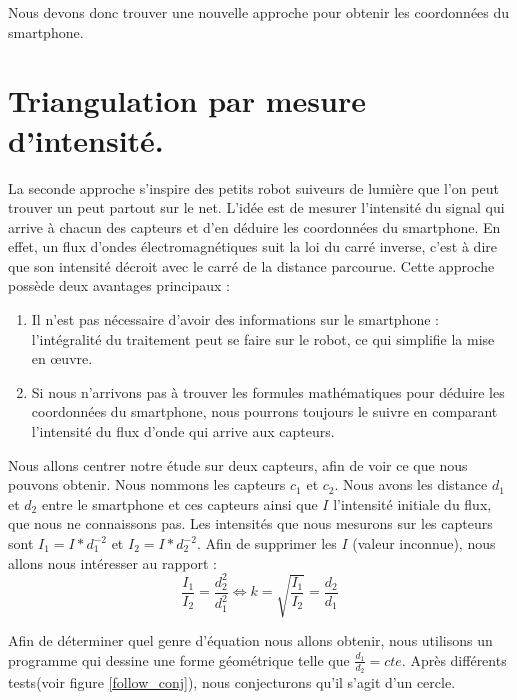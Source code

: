 Nous devons donc trouver une nouvelle approche pour obtenir les coordonnées du smartphone.

\section{Triangulation par mesure d'intensité.}
La seconde approche s'inspire des petits robot suiveurs de lumière que l'on peut trouver un peut partout sur le net. L'idée est de mesurer l'intensité du signal qui arrive à chacun des capteurs et d'en déduire les coordonnées du smartphone. En effet, un flux d'ondes électromagnétiques suit la loi du carré inverse, c'est à dire que son intensité décroit avec le carré de la distance parcourue. Cette approche possède deux avantages principaux : \begin{enumerate}
    \item Il n'est pas nécessaire d'avoir des informations sur le smartphone : l'intégralité du traitement peut se faire sur le robot, ce qui simplifie la mise en œuvre.
    \item Si nous n'arrivons pas à trouver les formules mathématiques pour déduire les coordonnées du smartphone, nous pourrons toujours le suivre en comparant l'intensité du flux d'onde qui arrive aux capteurs.
\end{enumerate}

Nous allons centrer notre étude sur deux capteurs, afin de voir ce que nous pouvons obtenir. Nous nommons les capteurs $c_1$ et $c_2$. Nous avons les distance $d_1$ et $d_2$ entre le smartphone et ces capteurs ainsi que $I$ l'intensité initiale du flux, que nous ne connaissons pas. Les intensités que nous mesurons sur les capteurs sont $I_1=I*d_1^{-2}$ et $I_2=I*d_2^{-2}$. Afin de supprimer les $I$ (valeur inconnue), nous allons nous intéresser au rapport :
\[ \frac{I_1}{I_2} = \frac{d_2^2}{d_1^2} \Leftrightarrow k=\sqrt{\frac{I_1}{I_2}}=\frac{d_2}{d_1} \]

Afin de déterminer quel genre d'équation nous allons obtenir, nous utilisons un programme qui dessine une forme géométrique telle que $\frac{d_1}{d_2} = cte$. Après différents tests(voir figure \ref{follow_conj}), nous conjecturons qu'il s'agit d'un cercle.

